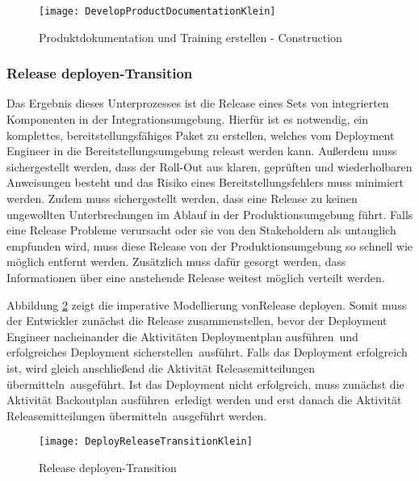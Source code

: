 \begin{figure}[!htbp]
\begin{center}
  \texttt{[image: DevelopProductDocumentationKlein]} %
  \caption{Produktdokumentation und Training erstellen - Construction}
  \label{fig:DevelopProductDocumentationKlein}
\end{center}
\end{figure}


\subsubsection{Release deployen-Transition}


Das Ergebnis dieses Unterprozesses ist die Release eines Sets von integrierten Komponenten in der Integrationsumgebung. Hierfür ist es notwendig, ein komplettes, bereitstellungsfähiges Paket zu erstellen, welches vom Deployment Engineer in die Bereitstellungsumgebung releast werden kann.
 Außerdem muss sichergestellt werden, dass der Roll-Out aus klaren, geprüften und wiederholbaren Anweisungen besteht und das Risiko eines Bereitstellungsfehlers muss minimiert werden.
 Zudem muss sichergestellt werden, dass eine Release zu keinen ungewollten Unterbrechungen im Ablauf in der Produktionsumgebung führt. Falls eine Release Probleme verursacht oder sie von den Stakeholdern als untauglich empfunden wird, muss diese Release von der Produktionsumgebung so schnell wie möglich entfernt werden. Zusätzlich muss dafür gesorgt werden, dass Informationen über eine anstehende Release weitest möglich verteilt werden.\newline
 
  Abbildung \ref{fig:DeployReleaseTransitionKlein} zeigt die imperative Modellierung von\grqq Release deployen\grqq.
  Somit muss der Entwickler zunächst die \grqq Release zusammenstellen\grqq, bevor der Deployment Engineer nacheinander die Aktivitäten \grqq Deploymentplan ausführen\grqq \ und \grqq erfolgreiches Deployment sicherstellen\grqq \ ausführt. Falls das Deployment erfolgreich ist, wird gleich anschließend die Aktivität \grqq Releasemitteilungen übermitteln\grqq \ ausgeführt. Ist das Deployment nicht erfolgreich, muss zunächst die Aktivität \grqq Backoutplan ausführen\grqq \ erledigt werden und erst danach die Aktivität \grqq Releasemitteilungen übermitteln\grqq \ ausgeführt werden.


\begin{figure}[!htbp]
\begin{center}
  \texttt{[image: DeployReleaseTransitionKlein]} %
  \caption{Release deployen-Transition}
  \label{fig:DeployReleaseTransitionKlein}
\end{center}
\end{figure}



